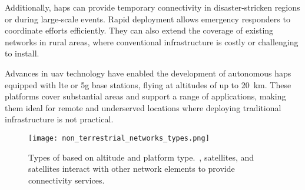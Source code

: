 Additionally, \glspl{hap} can provide temporary connectivity in disaster-stricken regions or during large-scale events. Rapid deployment allows emergency responders to coordinate efforts efficiently. They can also extend the coverage of existing networks in rural areas, where conventional infrastructure is costly or challenging to install.

Advances in \gls{uav} technology have enabled the development of autonomous \glspl{hap} equipped with \gls{lte} or \gls{5g} base stations, flying at altitudes of up to \SI{20}{\kilo\meter}. These platforms cover substantial areas and support a range of applications, making them ideal for remote and underserved locations where deploying traditional infrastructure is not practical.

\begin{figure}
  \texttt{[image: non\_terrestrial\_networks\_types.png]}
  \caption{Types of  based on altitude and platform type.\ ,  satellites, and  satellites interact with other network elements to provide connectivity services.\ \autocite{alertifyAirbusNTT}}\label{fig:ntn_types}
\end{figure}
